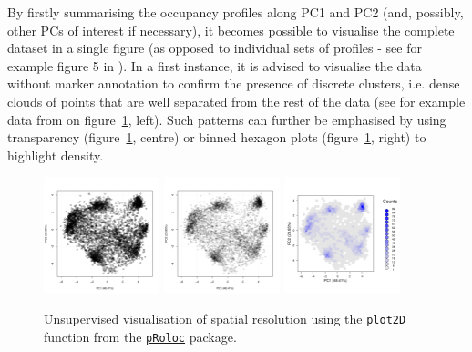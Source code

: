 \documentclass[12pt]{article}\usepackage[]{graphicx}\usepackage[]{color}
\newcommand{\Rpackage}[1]{\texttt{#1}}
\newcommand\Biocpkg[1]{%
  {\href{http://bioconductor.org/packages/#1}%
    {\Rpackage{#1}}}}
\begin{document}
By firstly summarising the occupancy profiles along PC1 and PC2 (and,
possibly, other PCs of interest if necessary), it becomes possible to
visualise the complete dataset in a single figure (as opposed to
individual sets of profiles - see for example figure 5 in
\citet{Gatto:2010}). In a first instance, it is advised to visualise
the data without marker annotation to confirm the presence of discrete
clusters, i.e. dense clouds of points that are well separated from the
rest of the data (see for example data from \citet{Christoforou:2016}
on figure~\ref{fig:density}, left). Such patterns can further be
emphasised by using transparency (figure~\ref{fig:density}, centre) or
binned hexagon plots (figure~\ref{fig:density}, right) to highlight
density.



\begin{figure}[ht]
  \centering
  \includegraphics[width = 0.3\textwidth]{./figure/density-1.pdf}
  \includegraphics[width = 0.3\textwidth]{./figure/density-2.pdf}
  \includegraphics[width = 0.3\textwidth]{./figure/density-3.pdf}
  \caption{Unsupervised visualisation of spatial resolution using the
    \texttt{plot2D} function from the \Biocpkg{pRoloc} package. }
  \label{fig:density}
\end{figure}
\end{document}
